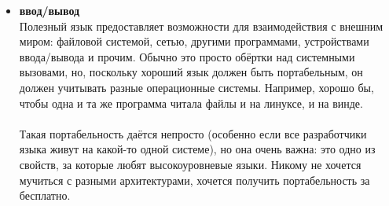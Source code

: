\documentclass[11pt]{book}
\begin{document}
\begin{itemize}
\item \textbf{ввод/вывод}
    \\
    Полезный язык предоставляет возможности для взаимодействия с внешним миром:
    файловой системой, сетью, другими программами, устройствами ввода/вывода и прочим.
    Обычно это просто обёртки над системными вызовами, но, поскольку хороший язык должен быть портабельным,
    он должен учитывать разные операционные системы.
    Например, хорошо бы, чтобы одна и та же программа читала файлы и на линуксе, и на винде.
    \\ \\
    Такая портабельность даётся непросто (особенно если все разработчики языка живут на какой-то одной системе),
    но она очень важна: это одно из свойств, за которые любят высокоуровневые языки.
    Никому не хочется мучиться с разными архитектурами, хочется получить портабельность за бесплатно.


\end{itemize}
\end{document}
